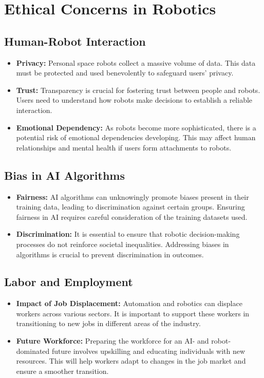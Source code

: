 \section{Ethical Concerns in Robotics}

\subsection{Human-Robot Interaction}
\begin{itemize}
    \item \textbf{Privacy:} Personal space robots collect a massive volume of data. This data must be protected and used benevolently to safeguard users' privacy.
    
    \item \textbf{Trust:} Transparency is crucial for fostering trust between people and robots. Users need to understand how robots make decisions to establish a reliable interaction.
    
    \item \textbf{Emotional Dependency:} As robots become more sophisticated, there is a potential risk of emotional dependencies developing. This may affect human relationships and mental health if users form attachments to robots.
\end{itemize}

\subsection{Bias in AI Algorithms}
\begin{itemize}
    \item \textbf{Fairness:} AI algorithms can unknowingly promote biases present in their training data, leading to discrimination against certain groups. Ensuring fairness in AI requires careful consideration of the training datasets used.
    
    \item \textbf{Discrimination:} It is essential to ensure that robotic decision-making processes do not reinforce societal inequalities. Addressing biases in algorithms is crucial to prevent discrimination in outcomes.
\end{itemize}

\subsection{Labor and Employment}
\begin{itemize}
    \item \textbf{Impact of Job Displacement:} Automation and robotics can displace workers across various sectors. It is important to support these workers in transitioning to new jobs in different areas of the industry.
    
    \item \textbf{Future Workforce:} Preparing the workforce for an AI- and robot-dominated future involves upskilling and educating individuals with new resources. This will help workers adapt to changes in the job market and ensure a smoother transition.\cite{haselagerjablonka-linabneybekey}
\end{itemize}
